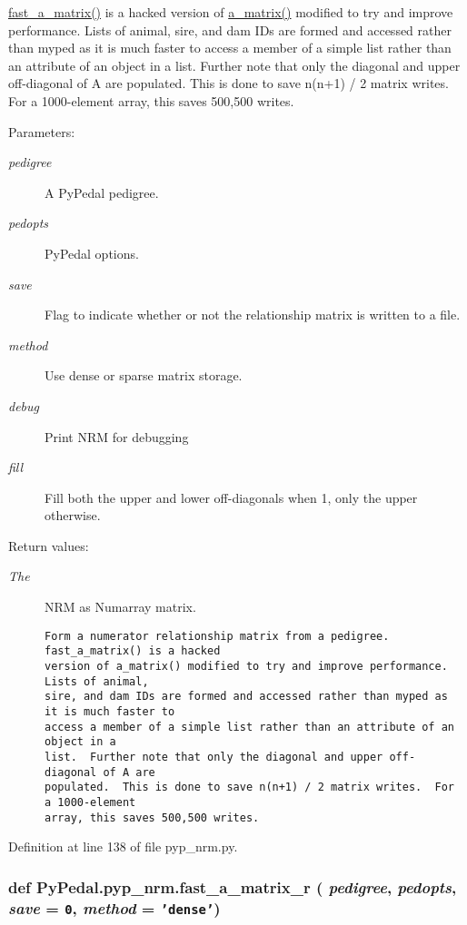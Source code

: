 \hyperlink{namespacePyPedal_1_1pyp__nrm_d86974b6cb70f5165d7f9b41b68b613e}{fast\_\-a\_\-matrix()} is a hacked version of \hyperlink{namespacePyPedal_1_1pyp__nrm_160c730a5f8ed4809c427645d3331262}{a\_\-matrix()} modified to try and improve performance. Lists of animal, sire, and dam IDs are formed and accessed rather than myped as it is much faster to access a member of a simple list rather than an attribute of an object in a list. Further note that only the diagonal and upper off-diagonal of A are populated. This is done to save n(n+1) / 2 matrix writes. For a 1000-element array, this saves 500,500 writes. \begin{Desc}
\item[Parameters:]
\begin{description}
\item[{\em pedigree}]A Py\-Pedal pedigree. \item[{\em pedopts}]Py\-Pedal options. \item[{\em save}]Flag to indicate whether or not the relationship matrix is written to a file. \item[{\em method}]Use dense or sparse matrix storage. \item[{\em debug}]Print NRM for debugging \item[{\em fill}]Fill both the upper and lower off-diagonals when 1, only the upper otherwise. \end{description}
\end{Desc}
\begin{Desc}
\item[Return values:]
\begin{description}
\item[{\em The}]NRM as Numarray matrix.

\footnotesize\begin{verbatim}Form a numerator relationship matrix from a pedigree.  fast_a_matrix() is a hacked
version of a_matrix() modified to try and improve performance.  Lists of animal,
sire, and dam IDs are formed and accessed rather than myped as it is much faster to
access a member of a simple list rather than an attribute of an object in a
list.  Further note that only the diagonal and upper off-diagonal of A are
populated.  This is done to save n(n+1) / 2 matrix writes.  For a 1000-element
array, this saves 500,500 writes.
\end{verbatim}
\normalsize
 \end{description}
\end{Desc}


Definition at line 138 of file pyp\_\-nrm.py.\hypertarget{namespacePyPedal_1_1pyp__nrm_314c945257fa3c101f6c47c1d4fb4079}{
\subsubsection[fast\_\-a\_\-matrix\_\-r]{\setlength{\rightskip}{0pt plus 5cm}def Py\-Pedal.pyp\_\-nrm.fast\_\-a\_\-matrix\_\-r ( {\em pedigree},  {\em pedopts},  {\em save} = {\tt 0},  {\em method} = {\tt 'dense'})}}
\label{namespacePyPedal_1_1pyp__nrm_314c945257fa3c101f6c47c1d4fb4079}


